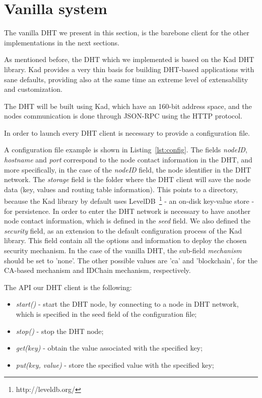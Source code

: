 \section{Vanilla system}

The vanilla \ac{DHT} we present in this section, is the barebone client for the other implementations in the next sections.

As mentioned before, the \ac{DHT} which we implemented is based on the Kad DHT library.
Kad provides a very thin basis for building DHT-based applications with sane defaults, providing also at the same time an extreme level of extensability and customization.

The DHT will be built using Kad, which have an 160-bit address space, and the nodes communication is done through JSON-RPC using the \ac{HTTP} protocol.

In order to launch every DHT client is necessary to provide a configuration file.



A configuration file example is shown in Listing~\ref{lst:config}.
The fields \textit{nodeID}, \textit{hostname} and \textit{port} correspond to the node contact information in the DHT, and more specifically, in the case of the \textit{nodeID} field, the node identifier in the DHT network.
The \textit{storage} field is the folder where the DHT client will save the node data (key, values and routing table information). This points to a directory, because the Kad library by default uses LevelDB~\footnote{http://leveldb.org/} - an on-disk key-value store - for persistence.
In order to enter the DHT network is necessary to have another node contact information, which is defined in the \textit{seed} field.
We also defined the \textit{security} field, as an extension to the default configuration process of the Kad library.
This field contain all the options and information to deploy the chosen security mechanism.
In the case of the vanilla DHT, the sub-field \textit{mechanism} should be set to 'none'.
The other possible values are 'ca' and 'blockchain', for the CA-based mechanism and IDChain mechanism, respectively.

The \ac{API} our DHT client is the following:

\begin{itemize}
  \item \textit{start()} - start the DHT node, by connecting to a node in DHT network, which is specified in the seed field of the configuration file;
  \item \textit{stop()} - stop the DHT node;
  \item \textit{get(key)} - obtain the value associated with the specified key;
  \item \textit{put(key, value)} - store the specified value with the specified key;
\end{itemize}

